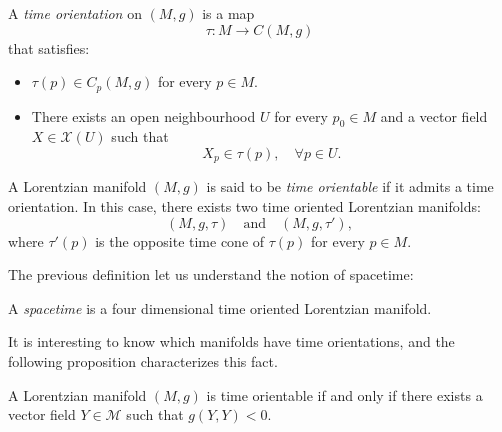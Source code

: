 \begin{definition}
	A \emph{time orientation} on $(M,g)$ is a map
	\[
		\tau \colon M \to C(M,g)
	\]
	that satisfies:
	\begin{itemize}
		\item $\tau(p) \in C_p(M,g)$ for every $p \in M$.
		\item There exists an open neighbourhood $U$ for every $p_0 \in M$ and a vector field $X \in \mathcal{X}(U)$ such that
		\[
			X_p \in \tau(p), \quad \forall p \in U.
		\]
	\end{itemize}

	A Lorentzian manifold $(M,g)$ is said to be \emph{time orientable} if it admits a time orientation. In this case, there exists two time oriented Lorentzian manifolds:
	\[
		(M,g,\tau) \quad\textrm{and}\quad (M,g,\tau'),
	\]
	where $\tau'(p)$ is the opposite time cone of $\tau(p)$ for every $p\in M$.
\end{definition}

The previous definition let us understand the notion of spacetime:

\begin{definition}[Spacetime]
	A \emph{spacetime} is a four dimensional time oriented Lorentzian manifold.
\end{definition}

It is interesting to know which manifolds have time orientations, and the following proposition characterizes this fact.

\begin{proposition}
	\label{pro:timeorientable}
	A Lorentzian manifold $(M,g)$ is time orientable if and only if there exists a vector field $Y \in \mathcal{M}$ such that $g(Y,Y) < 0$.
\end{proposition}

